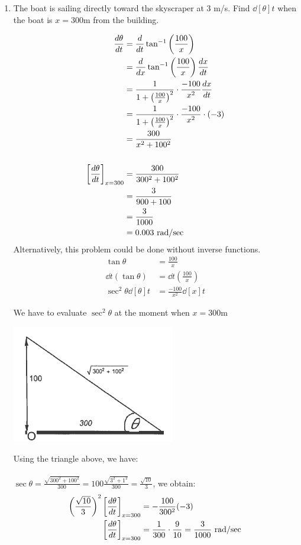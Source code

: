 \documentclass[nooutcomes]{ximera}
\begin{document}
\begin{problem}
\begin{enumerate}
	\item The boat is sailing directly toward the skyscraper at $3$ m/s.  Find $\dd[\theta]{t}$ when the boat is $x=300$m from the building.
	\begin{freeResponse}
	\begin{align*}
	\frac{d\theta}{dt}&=\dd{t}\tan^{-1}\left( \frac{100}{x} \right)\\
	&=\dd{x}\tan^{-1}\left( \frac{100}{x} \right)\dd[x]{t}\\
	&=\frac{1}{1+\left(\frac{100}{x}\right)^2} \cdot \frac{-100}{x^2} \dd[x]{t}\\
	&=\frac{1}{1+\left(\frac{100}{x}\right)^2} \cdot \frac{-100}{x^2} \cdot (-3)\\
	&=\frac{300}{x^2+100^2}\\\\
	\eval{\dd[\theta]{t}}_{x=300}&=\frac{300}{300^2+100^2}\\
	&=\frac{3}{900+100}\\
	&=\frac{3}{1000}\\
	&=0.003\ \text{rad/sec}
		\end{align*}
		Alternatively, this problem could be done without inverse functions.\\
	\begin{align*}
	\tan\theta&=\frac{100}{x}\\
	\dd{t}(\tan\theta)&=\dd{t} \left(\frac{100}{x}\right)\\
	\sec^2\theta \dd[\theta]{t}&=\frac{-100}{x^2}\dd[x]{t}
	\end{align*}
	
	We have to evaluate $\sec^2\theta$ at the moment when $x=300$m\\
	    \begin{image}
      \includegraphics[scale = 0.7]{figure7.png}
    \end{image}
	Using the triangle above, we have:\\\\
	$\sec\theta=\frac{\sqrt{300^2+100^2}}{300}=100\frac{\sqrt{3^2+1^2}}{300}=\frac{\sqrt{10}}{3}$, we obtain:\\
	\begin{align*}
	\left(\frac{\sqrt{10}}{3}\right)^2 \eval{\dd[\theta]{t}}_{x=300}&=-\frac{100}{300^2}(-3)\\
	\eval{\dd[\theta]{t}}_{x=300}&=\frac{1}{300} \cdot\frac{9}{10}=\frac{3}{1000}\  \text{rad/sec}
	\end{align*}

	\end{freeResponse}
\end{enumerate}
\end{problem}
\end{document}
